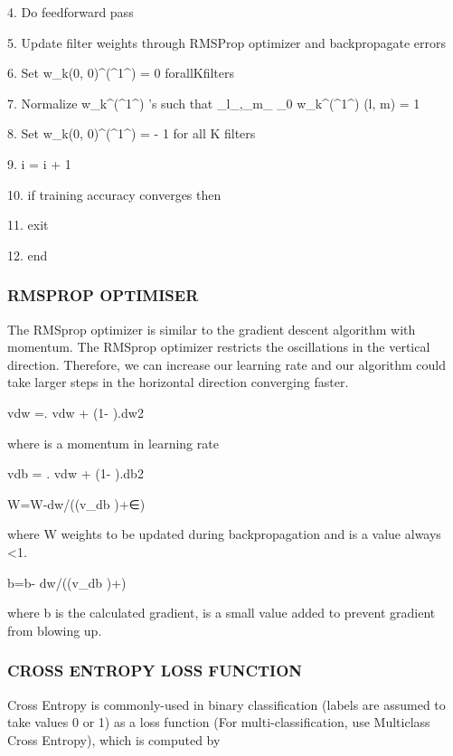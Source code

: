 4.	Do  feedforward  pass 

5.	Update filter weights through RMSProp optimizer and backpropagate errors 

6.	Set w_k(0, 0)^(^1^) = 0  for\tab all\tab K\tab filters 

7.	Normalize w_k^(^1^)  ’s  such  that  \Sigma_l_,_m_ \neq _0 w_k^(^1^)   (l, m) = 1 

8.	Set w_k(0, 0)^(^1^) = - 1   for  all  K  filters 

9.	i = i + 1 

10.	if training accuracy converges then

11.	exit 

12.	end 


\subsubsection{RMSPROP OPTIMISER }
The RMSprop optimizer is similar to the gradient descent algorithm with momentum. The RMSprop optimizer restricts the oscillations in the vertical direction. Therefore, we can increase our learning rate and our algorithm could take larger steps in the horizontal direction converging faster. 

              vdw =\beta. vdw  + (1- \beta).dw2  
                 
                     where  \beta is a momentum in learning rate 
              
              vdb  = \beta. vdw  + (1- \beta).db2
              
              W=W-\alpha dw/(\sqrt(v\_db )+∈)      
                     
                     where W weights to be updated during  backpropagation and  \alpha is a value always \textless 1.      
               
              b=b- \alpha dw/(\sqrt(v\_db )+\epsilon)     
              
                     where b is the calculated gradient, \epsilon is a small value added to prevent gradient from blowing up.

\subsubsection{CROSS ENTROPY LOSS FUNCTION}
Cross Entropy is commonly-used in binary classification (labels are assumed to take values 0 or 1) as a loss function (For multi-classification, use Multiclass Cross Entropy), which is computed by  

